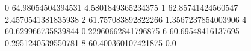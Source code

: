 0 64.98054504394531 4.5801849365234375
1 62.85741424560547 2.4570541381835938
2 61.757083892822266 1.3567237854003906
4 60.629966735839844 0.22960662841796875
6 60.69548416137695 0.2951240539550781
8 60.400360107421875 0.0
